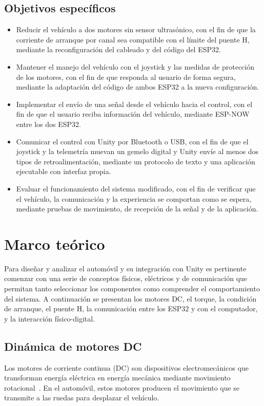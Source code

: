 \documentclass[journal]{IEEEtran}
\begin{document}
\subsection{Objetivos específicos}
\begin{itemize}
\item Reducir el vehículo a dos motores sin sensor ultrasónico, con el fin de que la corriente de arranque por canal sea compatible con el límite del puente H, mediante la reconfiguración del cableado y del código del ESP32.
\item Mantener el manejo del vehículo con el joystick y las medidas de protección de los motores, con el fin de que responda al usuario de forma segura, mediante la adaptación del código de ambos ESP32 a la nueva configuración.
\item Implementar el envío de una señal desde el vehículo hacia el control, con el fin de que el usuario reciba información del vehículo, mediante ESP-NOW entre los dos ESP32.
\item Comunicar el control con Unity por Bluetooth o USB, con el fin de que el joystick y la telemetría muevan un gemelo digital y Unity envíe al menos dos tipos de retroalimentación, mediante un protocolo de texto y una aplicación ejecutable con interfaz propia.
\item Evaluar el funcionamiento del sistema modificado, con el fin de verificar que el vehículo, la comunicación y la experiencia se comportan como se espera, mediante pruebas de movimiento, de recepción de la señal y de la aplicación.
\end{itemize}

\section{Marco teórico}
Para diseñar y analizar el automóvil y su integración con Unity es pertinente comenzar con una serie de conceptos físicos, eléctricos y de comunicación que permitan tanto seleccionar los componentes como comprender el comportamiento del sistema. A continuación se presentan los motores DC, el torque, la condición de arranque, el puente H, la comunicación entre los ESP32 y con el computador, y la interacción físico-digital.

\subsection{Dinámica de motores DC}
Los motores de corriente continua (DC) son dispositivos electromecánicos que transforman energía eléctrica en energía mecánica mediante movimiento rotacional~\cite{krause}. En el automóvil, estos motores producen el movimiento que se transmite a las ruedas para desplazar el vehículo.
\end{document}
